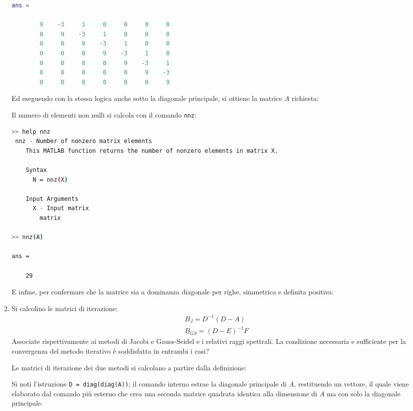 \begin{enumerate}
\begin{lstlisting}[language=MATLAB]
ans =

        9    -3     1     0     0     0     0
        0     9    -3     1     0     0     0
        0     0     9    -3     1     0     0
        0     0     0     9    -3     1     0
        0     0     0     0     9    -3     1
        0     0     0     0     0     9    -3
        0     0     0     0     0     0     9\end{lstlisting}
    Ed eseguendo con la stessa logica anche sotto la diagonale principale, si ottiene la matrice $A$ richiesta:
    

    Il numero di elementi non nulli si calcola con il comando \texttt{nnz}:
\begin{lstlisting}[language=bash]
>> help nnz
 nnz - Number of nonzero matrix elements
    This MATLAB function returns the number of nonzero elements in matrix X.

    Syntax
      N = nnz(X)

    Input Arguments
      X - Input matrix
        matrix

>> nnz(A)

ans =

    29
\end{lstlisting}
    E infine, per confermare che la matrice sia a dominanza diagonale per righe, simmetrica e definita positiva:
    


    \item Si calcolino le matrici di iterazione:
    \begin{gather*}
        B_{J} = D^{-1}\left(D - A\right) \\
        B_{GS} = \left(D - E\right)^{-1}F
    \end{gather*}
    Associate rispettivamente ai metodi di Jacobi e Gauss-Seidel e i relativi raggi spettrali. La condizione necessaria e sufficiente per la convergenza del metodo iterativo è soddisfatta in entrambi i casi?

    Le matrici di iterazione dei due metodi si calcolano a partire dalla definizione:
    

    Si noti l'istruzione \texttt{D = diag(diag(A))}; il comando interno estrae la diagonale principale di $A$, restituendo un vettore, il quale viene elaborato dal comando più esterno che crea una seconda matrice quadrata identica alla dimensione di $A$ ma con solo la diagonale principale.


\end{enumerate}
